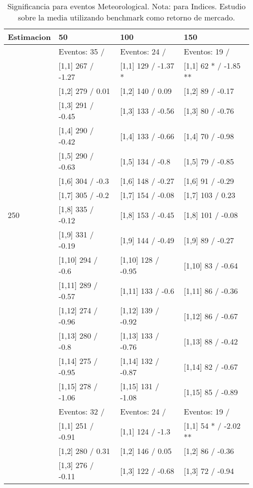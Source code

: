 \begin{table}

\caption{Significancia para eventos Meteorological. Nota: para Indices. Estudio sobre la media utilizando benchmark como retorno de mercado.}
\centering
\begin{tabular}[t]{llll}
\toprule
Estimacion & 50 & 100 & 150\\
\midrule
 & Eventos:  35 / & Eventos:  24 / & Eventos:  19 /\\
 & {}[1,1] 267  / -1.27 & {}[1,1] 129  / -1.37 * & {}[1,1] 62 * / -1.85 **\\
 & {}[1,2] 279  / 0.01 & {}[1,2] 140  / 0.09 & {}[1,2] 89  / -0.17\\
 & {}[1,3] 291  / -0.45 & {}[1,3] 133  / -0.56 & {}[1,3] 80  / -0.76\\
 & {}[1,4] 290  / -0.42 & {}[1,4] 133  / -0.66 & {}[1,4] 70  / -0.98\\
\addlinespace
 & {}[1,5] 290  / -0.63 & {}[1,5] 134  / -0.8 & {}[1,5] 79  / -0.85\\
 & {}[1,6] 304  / -0.3 & {}[1,6] 148  / -0.27 & {}[1,6] 91  / -0.29\\
 & {}[1,7] 305  / -0.2 & {}[1,7] 154  / -0.08 & {}[1,7] 103  / 0.23\\
250 & {}[1,8] 335  / -0.12 & {}[1,8] 153  / -0.45 & {}[1,8] 101  / -0.08\\
 & {}[1,9] 331  / -0.19 & {}[1,9] 144  / -0.49 & {}[1,9] 89  / -0.27\\
\addlinespace
 & {}[1,10] 294  / -0.6 & {}[1,10] 128  / -0.95 & {}[1,10] 83  / -0.64\\
 & {}[1,11] 289  / -0.57 & {}[1,11] 133  / -0.6 & {}[1,11] 86  / -0.36\\
 & {}[1,12] 274  / -0.96 & {}[1,12] 139  / -0.92 & {}[1,12] 86  / -0.67\\
 & {}[1,13] 280  / -0.8 & {}[1,13] 133  / -0.76 & {}[1,13] 88  / -0.42\\
 & {}[1,14] 275  / -0.95 & {}[1,14] 132  / -0.87 & {}[1,14] 82  / -0.67\\
\addlinespace
 & {}[1,15] 278  / -1.06 & {}[1,15] 131  / -1.08 & {}[1,15] 85  / -0.89\\
 & Eventos:  32 / & Eventos:  24 / & Eventos:  19 /\\
 & {}[1,1] 251  / -0.91 & {}[1,1] 124  / -1.3 & {}[1,1] 54 * / -2.02 **\\
 & {}[1,2] 280  / 0.31 & {}[1,2] 146  / 0.05 & {}[1,2] 86  / -0.36\\
 & {}[1,3] 276  / -0.11 & {}[1,3] 122  / -0.68 & {}[1,3] 72  / -0.94\\

\end{tabular}
\end{table}
